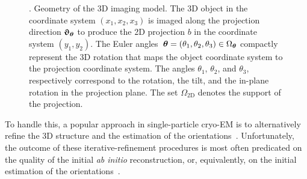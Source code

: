 \begin{figure}[t!]
\caption{. Geometry of the 3D imaging model. The 3D object in the coordinate system $(x_1,x_2, x_3)$ is imaged along the projection direction ${\boldsymbol{\upvartheta}}_{{\boldsymbol{\theta}}}$ to produce the 2D projection $b$ in the coordinate system $(y_1,y_2)$. The Euler angles~${\boldsymbol{\theta}}=(\theta_1,\theta_2,\theta_3)\in\Omega_{\boldsymbol{\theta}}$ compactly represent the 3D rotation that maps the object coordinate system to the projection coordinate system. The angles $\theta_1$, $\theta_2$, and $\theta_3$, respectively correspond to the rotation, the tilt, and the in-plane rotation in the projection plane. The set $\Omega_{\mathrm{2D}}$ denotes the support of the projection.}
\label{fig:imaging-geometry}
\end{figure}

To handle this, a popular approach in single-particle cryo-EM is to alternatively refine the 3D structure and the estimation of the orientations~\cite{penczek1994ribosome,Baker1996,Dempster1977,sigworth1998maximum,scheres2012bayesian,zehni2020joint}. Unfortunately, the outcome of these iterative-refinement procedures is most often predicated on the quality of the initial \textit{ab initio} reconstruction, or, equivalently, on the initial estimation of the orientations~\cite{sorzano2006optimization,henderson2012outcome}.

